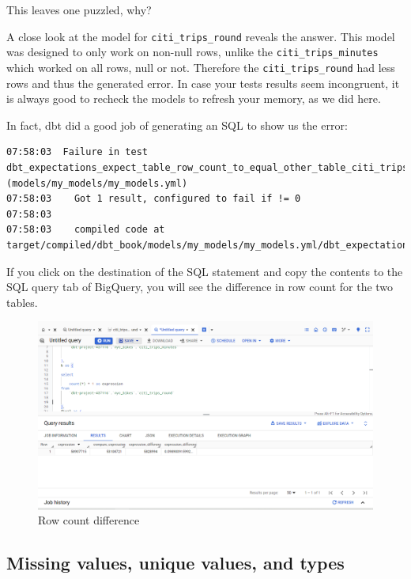 \documentclass[
]{book}
\begin{document}
This leaves one puzzled, why?

A close look at the model for \texttt{citi\_trips\_round} reveals the answer. This model was designed to only work on non-null rows, unlike the \texttt{citi\_trips\_minutes} which worked on all rows, null or not. Therefore the \texttt{citi\_trips\_round} had less rows and thus the generated error. In case your tests results seem incongruent, it is always good to recheck the models to refresh your memory, as we did here.

In fact, dbt did a good job of generating an SQL to show us the error:

\begin{verbatim}
07:58:03  Failure in test dbt_expectations_expect_table_row_count_to_equal_other_table_citi_trips_minutes_ref_citi_trips_round_ (models/my_models/my_models.yml)
07:58:03    Got 1 result, configured to fail if != 0
07:58:03  
07:58:03    compiled code at target/compiled/dbt_book/models/my_models/my_models.yml/dbt_expectations_expect_table__c00100dada30a31f15f90b9c1ba0b295.sql
\end{verbatim}

If you click on the destination of the SQL statement and copy the contents to the SQL query tab of BigQuery, you will see the difference in row count for the two tables.

\begin{figure}
\centering
\includegraphics{./images/row_count_difference.png}
\caption{Row count difference}
\end{figure}

\hypertarget{missing-values-unique-values-and-types}{%
\subsection{Missing values, unique values, and types}\label{missing-values-unique-values-and-types}}
\end{document}
